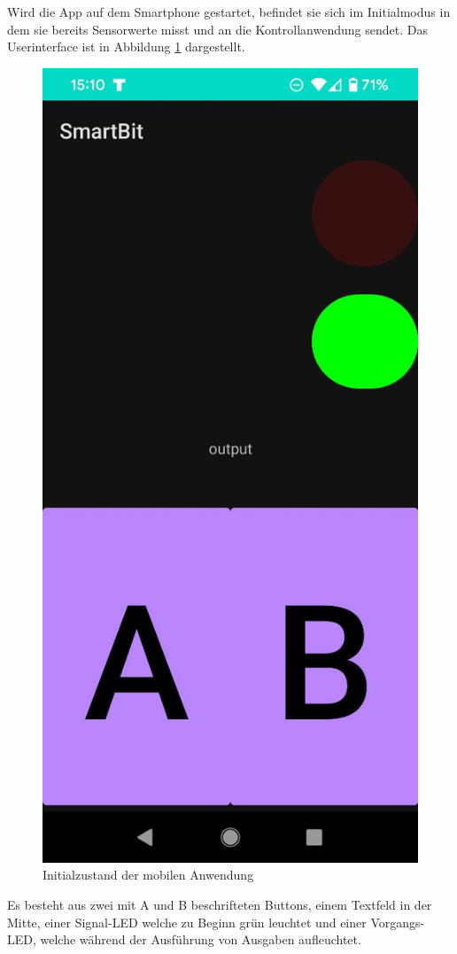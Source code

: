 \documentclass[11pt,a4paper]{report}
\begin{document}
Wird die App auf dem Smartphone gestartet, befindet sie sich im Initialmodus in dem sie bereits Sensorwerte misst und an die Kontrollanwendung sendet.
Das Userinterface ist in Abbildung \ref{fig:initial_app} dargestellt.
\begin{figure}[htbp]
  \centering
  \includegraphics[height=0.4\textheight]{images/app_initial}
  \caption{Initialzustand der mobilen Anwendung}
  \label{fig:initial_app}
\end{figure}
Es besteht aus zwei mit A und B beschrifteten Buttons, einem Textfeld in der Mitte, einer Signal-LED welche zu Beginn grün leuchtet und einer Vorgangs-LED, welche während der Ausführung von Ausgaben aufleuchtet.
\end{document}
